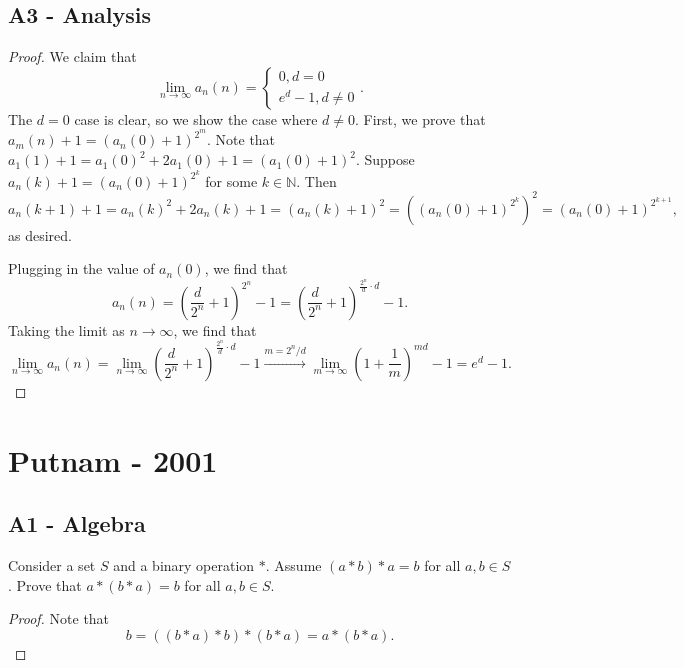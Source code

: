 \documentclass[11pt]{scrartcl}
\newcommand{\N}{\mathbb{N}}
\begin{document}
\subsection{A3 - Analysis}
\begin{proof}  We claim that 
$$\lim_{n \to \infty} a_n(n) = \begin{cases} 0, d = 0 \\
e^{d}-1, d \ne 0
\end{cases}.$$
The $d=0$ case is clear, so we show the case where $d \ne 0$.  First, we prove that $a_m(n)+1 = (a_n(0)+1)^{2^{m}}.$  Note that $a_1(1) + 1 = a_1(0)^2 + 2a_1(0) + 1 = (a_1(0) + 1)^2$.  Suppose $a_n(k) + 1 = (a_n(0)+1)^{2^{k}}$ for some $k \in \N$.  Then
$$a_{n}(k+1)+1 = a_{n}(k)^2 + 2a_n(k)+1 = (a_n(k) + 1)^2 = ((a_n(0)+1)^{2^k})^2 = (a_n(0) + 1)^{2^{k+1}},$$
as desired.

Plugging in the value of $a_n(0)$, we find that 
$$a_n(n) = \left (\frac{d}{2^n} + 1\right )^{2^n} - 1 = \left (\frac{d}{2^n} + 1\right )^{\frac{2^n}{d} \cdot d} - 1.$$
Taking the limit as $n \to \infty$, we find that 
$$\lim_{n \to \infty} a_n(n) = \lim_{n \to \infty} \left (\frac{d}{2^n} + 1\right )^{\frac{2^n}{d} \cdot d} - 1 \xrightarrow{m = 2^n/d} \lim_{m \to \infty} \left (1+\frac{1}{m}\right )^{md} - 1 = e^{d} - 1.$$
\end{proof}
\pagebreak
\section{Putnam - 2001}
\subsection{A1 - Algebra}
\begin{Prob}[2001-A1] Consider a set $S$ and a binary operation $*$.  Assume $(a*b)*a = b$ for all $a, b \in S$.  Prove that $a*(b*a) = b$ for all $a, b \in S$. 
\end{Prob}
\begin{proof}
Note that 
$$b = ((b*a)*b) * (b*a) = a * (b * a).$$
\end{proof}
\end{document}
